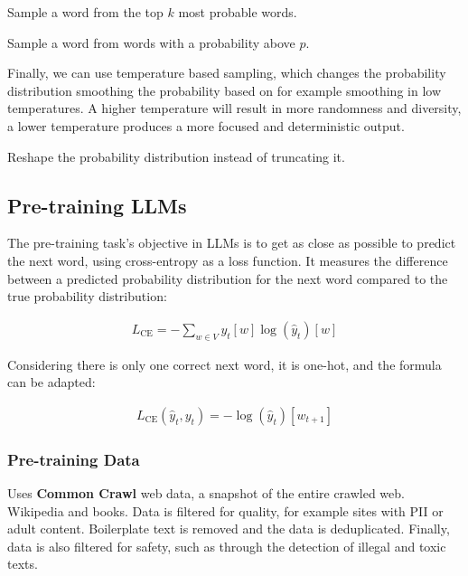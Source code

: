 \begin{definition}
  Sample a word from the top $k$ most probable words.
\end{definition}

\begin{definition}
  Sample a word from words with a probability above $p$.
\end{definition}

Finally, we can use temperature based sampling, which changes the
probability distribution smoothing
the probability based on for example smoothing in low temperatures. A
higher temperature will result in
more randomness and diversity, a lower temperature produces a  more
focused and deterministic output.

\begin{definition}
  Reshape the probability distribution instead of truncating it.
\end{definition}

\subsection{Pre-training LLMs}

The pre-training task's objective in LLMs is to get as close as
possible to predict the next
word, using cross-entropy as a loss function. It measures the
difference between a predicted
probability distribution for the next word compared to the true
probability distribution:

\begin{definition}
  \begin{align*}
    L_\text{CE} = - \sum_{w \in V} y_t [w] \log(\hat{y}_t) [w]
  \end{align*}

  Considering there is only one correct next word, it is one-hot, and
  the formula can be adapted:

  \begin{align*}
    L_\text{CE}(\hat{y}_t, y_t) = -\log(\hat{y}_t) [w_{t+1}]
  \end{align*}
\end{definition}

\subsubsection{Pre-training Data}

Uses \textbf{Common Crawl} web data, a snapshot of the entire crawled
web. Wikipedia and books.
Data is filtered for quality, for example sites with PII or adult
content. Boilerplate text is removed and
the data is deduplicated. Finally, data is also filtered for safety,
such as through the detection of illegal and toxic texts.

